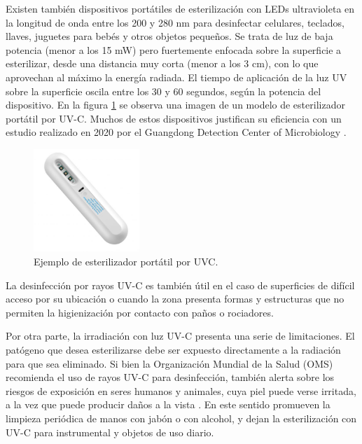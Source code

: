 Existen también dispositivos portátiles de esterilización con LEDs ultravioleta en la longitud de onda entre los 200 y 280 nm para desinfectar celulares, teclados, llaves, juguetes para bebés y otros objetos pequeños. Se trata de luz de baja potencia (menor a los 15 mW) pero fuertemente enfocada sobre la superficie a esterilizar, desde una distancia muy corta (menor a los 3 cm), con lo que aprovechan al máximo la energía radiada. El tiempo de  aplicación de la luz UV sobre la superficie oscila entre los 30 y 60 segundos, según la potencia del dispositivo. En la figura \ref{fig:esterilizador} se observa una imagen de un modelo de esterilizador portátil por UV-C. Muchos de estos dispositivos justifican su eficiencia con un estudio realizado en 2020 por el Guangdong Detection Center of Microbiology \citep{Guangdong}.   


\begin{figure}[h]
	\centering
	\includegraphics[width=4cm]{./Figures/esterilizador.PNG}
	\caption{Ejemplo de esterilizador portátil por UVC\protect\footnotemark.}
	\label{fig:esterilizador}
\end{figure}


La desinfección por rayos UV-C es también útil en el caso de superficies de difícil acceso por su ubicación o cuando la zona presenta formas y estructuras que no permiten la higienización por contacto con paños o rociadores. 

Por otra parte, la irradiación con luz UV-C presenta una serie de limitaciones. El patógeno que desea esterilizarse debe ser  expuesto directamente a la radiación para que sea eliminado. Si bien la Organización Mundial de la Salud (OMS) recomienda el uso de rayos UV-C para desinfección, también alerta sobre los riesgos de  exposición en seres humanos y animales, cuya piel puede verse irritada, a la vez que puede producir daños a la vista \citep{MYTH}. En este sentido promueven la limpieza periódica de manos con jabón o con alcohol, y dejan la esterilización con UV-C para  instrumental y objetos de uso diario.



